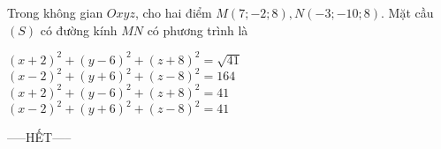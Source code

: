 \documentclass[12pt,a4paper]{article}
\begin{document}
\begin{ex}
 Trong không gian ${Oxyz}$, cho hai điểm $M(7;-2;8),N(-3;-10;8)$. Mặt cầu ${(S)}$ có đường kính ${MN}$ có phương trình là
 
\choice
{ $\left(x + 2\right)^{2}+\left(y - 6\right)^{2}+\left(z + 8\right)^{2}=\sqrt{41}$ }
   { $\left(x - 2\right)^{2}+\left(y + 6\right)^{2}+\left(z - 8\right)^{2}=164$ }
     { $\left(x + 2\right)^{2}+\left(y - 6\right)^{2}+\left(z + 8\right)^{2}=41$ }
    { \True $\left(x - 2\right)^{2}+\left(y + 6\right)^{2}+\left(z - 8\right)^{2}=41$ }
\end{ex}


 \begin{center}
-----HẾT-----
\end{center}

\end{document}
